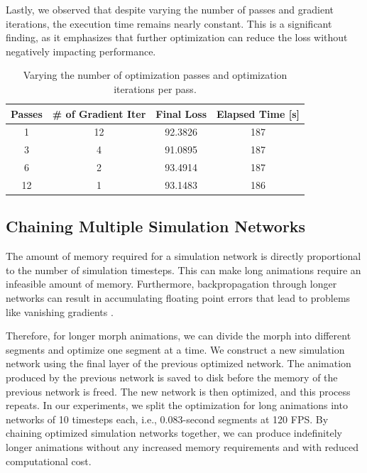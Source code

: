     Lastly, we observed that despite varying the number of passes and gradient iterations, the execution time remains nearly constant. This is a significant finding, as it emphasizes that further optimization can reduce the loss without negatively impacting performance.
    
    \begin{table}[ht!]
        \centering
        \small
        \caption{Varying the number of optimization passes and optimization iterations per pass.}
        \begin{tabular}{cccc}
        \toprule
        Passes & \# of Gradient Iter & Final Loss & Elapsed Time [s] \\
        \midrule
        1   & 12 & 92.3826 & 187 \\
        3   & 4  & 91.0895 & 187 \\
        6   & 2  & 93.4914 & 187 \\
        12  & 1  & 93.1483 & 186 \\
        \bottomrule
        \end{tabular}
        \label{tab:multipass}
    \end{table}
    
\subsection{Chaining Multiple Simulation Networks}
    The amount of memory required for a simulation network is directly proportional to the number of simulation timesteps.
    This can make long animations require an infeasible amount of memory.
    Furthermore, backpropagation through longer networks can result in accumulating floating point errors that lead to problems like vanishing gradients \citep{hochreiter1998vanishing}. 

    Therefore, for longer morph animations, we can divide the morph into different segments and optimize one segment at a time.
    We construct a new simulation network using the final layer of the previous optimized network.
    The animation produced by the previous network is saved to disk before the memory of the previous network is freed.
    The new network is then optimized, and this process repeats.
    In our experiments, we split the optimization for long animations into networks of 10 timesteps each, i.e., 0.083-second segments at 120 FPS.
    By chaining optimized simulation networks together, we can produce indefinitely longer animations without any increased memory requirements and with reduced computational cost.

